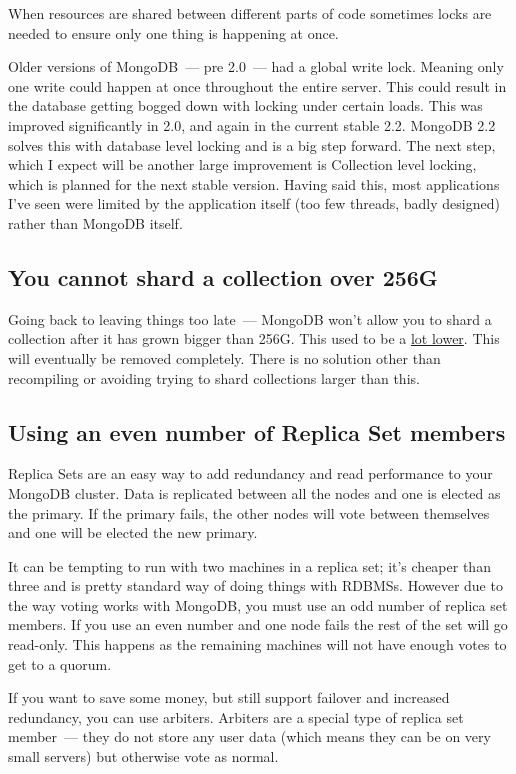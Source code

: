 When resources are shared between different parts of code sometimes locks are needed to ensure only one thing is happening at once.

Older versions of MongoDB~--- pre 2.0~--- had a global write lock. Meaning only one write could happen at once throughout the entire server. This could result in the database getting bogged down with locking under certain loads. This was improved significantly in 2.0, and again in the current stable 2.2. MongoDB 2.2 solves this with database level locking and is a big step forward. The next step, which I expect will be another large improvement is Collection level locking, which is planned for the next stable version.
Having said this, most applications I’ve seen were limited by the application itself (too few threads, badly designed) rather than MongoDB itself.

\subsection{You cannot shard a collection over 256G}

Going back to leaving things too late~--- MongoDB won’t allow you to shard a collection after it has grown bigger than 256G. This used to be a \href{https://jira.mongodb.org/browse/SERVER-2271}{lot lower}. This will eventually be removed completely. There is no solution other than recompiling or avoiding trying to shard collections larger than this.

\subsection{Using an even number of Replica Set members}

Replica Sets are an easy way to add redundancy and read performance to your MongoDB cluster. Data is replicated between all the nodes and one is elected as the primary. If the primary fails, the other nodes will vote between themselves and one will be elected the new primary.

It can be tempting to run with two machines in a replica set; it's cheaper than three and is pretty standard way of doing things with RDBMSs.
However due to the way voting works with MongoDB, you must use an odd number of replica set members. If you use an even number and one node fails the rest of the set will go read-only. This happens as the remaining machines will not have enough votes to get to a quorum.

If you want to save some money, but still support failover and increased redundancy, you can use arbiters. Arbiters are a special type of replica set member~--- they do not store any user data (which means they can be on very small servers) but otherwise vote as normal.

